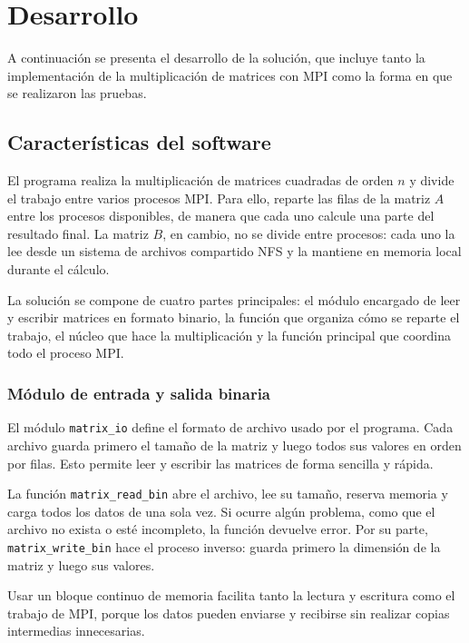 \section{Desarrollo}
\label{sec:Desarrollo}

A continuación se presenta el desarrollo de la solución, que incluye tanto la implementación de la multiplicación de matrices con MPI como la forma en que se realizaron las pruebas.

\subsection{Características del software}

El programa realiza la multiplicación de matrices cuadradas de orden \(n\) y divide el trabajo entre varios procesos MPI. Para ello, reparte las filas de la matriz \(A\) entre los procesos disponibles, de manera que cada uno calcule una parte del resultado final. La matriz \(B\), en cambio, no se divide entre procesos: cada uno la lee desde un sistema de archivos compartido NFS y la mantiene en memoria local durante el cálculo.

La solución se compone de cuatro partes principales: el módulo encargado de leer y escribir matrices en formato binario, la función que organiza cómo se reparte el trabajo, el núcleo que hace la multiplicación y la función principal que coordina todo el proceso MPI.

\subsubsection{Módulo de entrada y salida binaria}

El módulo \texttt{matrix\_io} define el formato de archivo usado por el programa. Cada archivo guarda primero el tamaño de la matriz y luego todos sus valores en orden por filas. Esto permite leer y escribir las matrices de forma sencilla y rápida.

La función \texttt{matrix\_read\_bin} abre el archivo, lee su tamaño, reserva memoria y carga todos los datos de una sola vez. Si ocurre algún problema, como que el archivo no exista o esté incompleto, la función devuelve error. Por su parte, \texttt{matrix\_write\_bin} hace el proceso inverso: guarda primero la dimensión de la matriz y luego sus valores.

Usar un bloque continuo de memoria facilita tanto la lectura y escritura como el trabajo de MPI, porque los datos pueden enviarse y recibirse sin realizar copias intermedias innecesarias.

